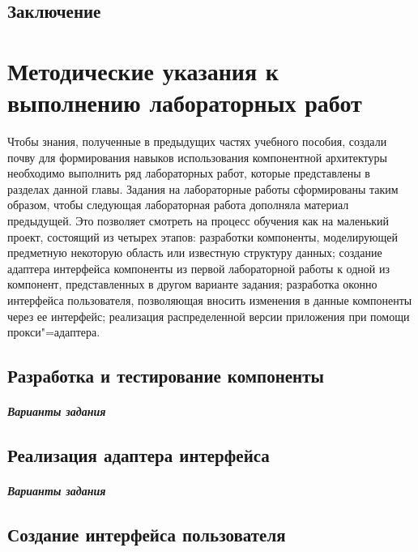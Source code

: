 \documentclass[a4paper,openany,twoside,final]{book}
\begin{document}
\newpage{}
\section{Заключение%
  \label{id53}%
}

\clearpage
\chapter{Методические указания к выполнению лабораторных работ}
\label{cha:labs}

Чтобы знания, полученные в предыдущих частях учебного пособия, создали почву для формирования навыков использования компонентной архитектуры необходимо выполнить ряд лабораторных работ, которые представлены в разделах данной главы.  Задания на лабораторные работы сформированы таким образом, чтобы следующая лабораторная работа дополняла материал предыдущей.  Это позволяет смотреть на процесс обучения как на маленький проект, состоящий из четырех этапов: разработки компоненты, моделирующей предметную некоторую область или известную структуру данных; создание адаптера интерфейса компоненты из первой лабораторной работы к одной из компонент, представленных в другом варианте задания; разработка оконно интерфейса пользователя, позволяющая вносить изменения в данные компоненты через ее интерфейс; реализация распределенной версии приложения при помощи прокси"=адаптера.

\section{Разработка и тестирование компоненты}
\label{sec:labcomp}
\newpage

\paragraph{Варианты задания}
\newpage

\section{Реализация адаптера интерфейса}
\label{sec:labadapter}
\newpage

\paragraph{Варианты задания}
\newpage

\section{Создание интерфейса пользователя}
\label{sec:labinterface}
\end{document}
